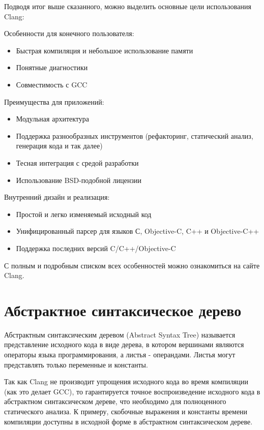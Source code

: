 Подводя итог выше сказанного, можно выделить основные цели использования Clang:

Особенности для конечного пользователя:
\begin{itemize}
\item Быстрая компиляция и небольшое использование памяти
\item Понятные диагностики
\item Совместимость с GCC
\end{itemize}

Преимущества для приложений:
\begin{itemize}
\item Модульная архитектура
\item Поддержка разнообразных инструментов (рефакторинг, статический анализ, генерация кода и так далее)
\item Тесная интеграция с средой разработки
\item Использование BSD-подобной лицензии
\end{itemize}

Внутренний дизайн и реализация:
\begin{itemize}
\item Простой и легко изменяемый исходный код
\item Унифицированный парсер для языков С, Objective-C, C++ и Objective-C++
\item Поддержка последних версий C/C++/Objective-C
\end{itemize}

С полным и подробным списком всех особенностей можно ознакомиться на сайте Clang.

\section{Абстрактное синтаксическое дерево}
Абстрактным синтаксическим деревом (Abstract Syntax Tree) называется представление исходного кода 
в виде дерева, в котором вершинами являются операторы языка программирования, а листья - операндами.
Листья могут представлять только переменные и константы. 

Так как Clang не производит упрощения исходного кода во время компиляции (как это делает GCC),
то гарантируется точное воспроизведение исходного кода в абстрактном синтаксическом дереве, 
что необходимо для полноценного статического анализа. К примеру, скобочные выражения и константы
времени компиляции доступны в исходной форме в абстрактном синтаксическом дереве.

